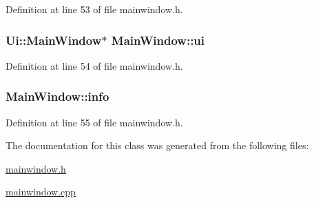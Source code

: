 Definition at line 53 of file mainwindow.\+h.

\hypertarget{class_main_window_a35466a70ed47252a0191168126a352a5}{
\subsubsection[{ui}]{\setlength{\rightskip}{0pt plus 5cm}Ui\+::\+Main\+Window$\ast$ Main\+Window\+::ui\hspace{0.3cm}{\ttfamily [private]}}}\label{class_main_window_a35466a70ed47252a0191168126a352a5}


Definition at line 54 of file mainwindow.\+h.

\hypertarget{class_main_window_a2d1f101eed410e692b5db9b7226174bf}{
\subsubsection[{info}]{ Main\+Window\+::info\hspace{0.3cm}{\ttfamily [private]}}}\label{class_main_window_a2d1f101eed410e692b5db9b7226174bf}


Definition at line 55 of file mainwindow.\+h.



The documentation for this class was generated from the following files\+:\begin{DoxyCompactItemize}
\item 
\hyperlink{mainwindow_8h}{mainwindow.\+h}\item 
\hyperlink{mainwindow_8cpp}{mainwindow.\+cpp}\end{DoxyCompactItemize}
